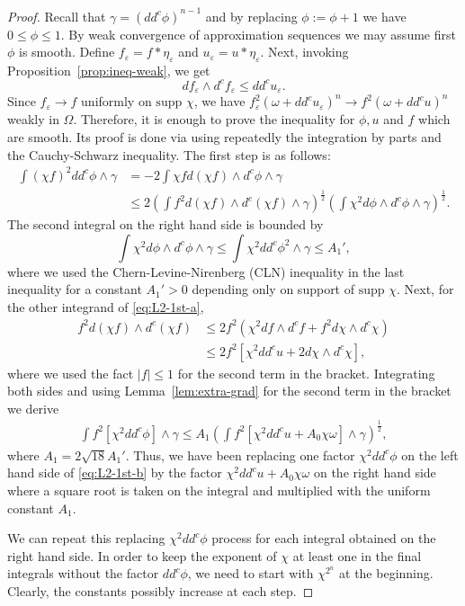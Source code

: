 \documentclass[10pt,a4paper]{amsart}
\newcommand{\Om}{\Omega}
\newcommand{\ga}{\gamma}
\newcommand{\om}{\omega}
\newcommand{\supp}{\mbox{supp }}
\newcommand{\veps}{\varepsilon}
\newcommand{\wed}{\wedge}
\begin{document}
\begin{proof} Recall that $\ga= (dd^c\phi)^{n-1}$ and by replacing $\phi :=\phi+1$ we have $0\leq \phi \leq 1$. By weak convergence of approximation sequences we may assume first $\phi$ is smooth. Define $f_\veps = f*\eta_\veps$ and $u_\veps= u*\eta_\veps$.  Next, invoking Proposition~\ref{prop:ineq-weak}, we get
$$
	d f_\veps \wed d^c f_\veps \leq dd^c u_\veps.
$$
Since $f_\veps \to f$ uniformly on $\supp \chi$, we have $f_\veps^2 (\om+dd^c u_\veps)^n \to f^2 (\om+dd^cu)^n$ weakly in $\Om$.  Therefore, it is enough to prove the inequality for $\phi, u$ and $f$ which are smooth. Its proof is done via using repeatedly the integration by parts and the Cauchy-Schwarz inequality. The first step  is as follows:
\[\label{eq:L2-1st-a}\begin{aligned}
	\int (\chi f)^2 dd^c\phi \wed\ga
&=-2 \int \chi f d(\chi f) \wed d^c \phi \wed\ga \\
&\leq  2\left(\int f^2 d(\chi f) \wed d^c(\chi f) \wed \ga \right)^\frac{1}{2}\left( \int \chi^2 d\phi \wed d^c\phi \wed \ga\right)^\frac{1}{2}.
\end{aligned}\]
The second integral on the right hand side  is bounded by
$$	
	 \int \chi^2 d\phi \wed d^c\phi \wed \ga \leq \int \chi^2 dd^c\phi^2 \wed \ga \leq A_1',
$$
 where we used the Chern-Levine-Nirenberg (CLN) inequality in the last  inequality for    a constant $A_1'>0$ depending only on support of $\supp \chi$. Next, for the other integrand of \eqref{eq:L2-1st-a},
$$\begin{aligned}
	f^2 d(\chi f) \wed d^c (\chi f) 
&\leq 2 f^2 (\chi^2 df \wed d^c f + f^2 d\chi \wed d^c\chi) \\
&\leq 2 f^2[\chi^2 dd^c u +2 d\chi \wed d^c\chi],
\end{aligned}$$
where we used the fact $|f|\leq 1$ for the second term in the bracket. Integrating both sides and 
using Lemma~\ref{lem:extra-grad} for the second term in the bracket  we derive
\[\label{eq:L2-1st-b}\begin{aligned}
	\int f^2 [\chi^2 dd^c\phi ]\wed\ga  \leq A_1 \left( \int  f^2 [ \chi^2  dd^c u + A_0 \chi \om]  \wed \ga\right)^\frac{1}{2},
\end{aligned}\]
where $A_1 = 2\sqrt{18} A_1'$.
Thus, we have been replacing one factor $\chi^2 dd^c \phi$ on the left hand side of \eqref{eq:L2-1st-b} by the factor $\chi^2 dd^c u + A_0 \chi \om $ on the right hand side where a square root is taken on the integral and multiplied with the uniform constant $A_1$.

We can repeat this replacing $\chi^2 dd^c \phi$ process for each  integral obtained on the right hand side. In order to keep the exponent of $\chi$ at least one in the final integrals without the factor $dd^c \phi$, we need to start with  $\chi^{2^n}$ at the beginning. Clearly, the constants possibly increase at each step.  


\end{proof}
\end{document}
